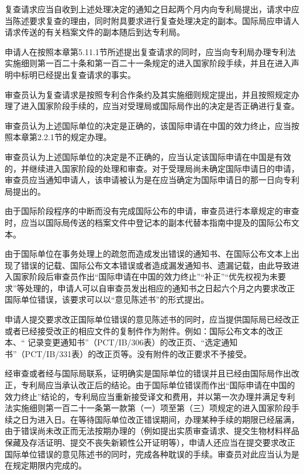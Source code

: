 复查请求应当自收到上述处理决定的通知之日起两个月内向专利局提出，请求中应当陈述要求复查的理由，同时附具要求进行复查处理决定的副本。国际局应申请人请求传送的有关档案文件的副本随后到达专利局。

申请人在按照本章第5.11.1节所述提出复查请求的同时，应当向专利局办理专利法实施细则第一百二十条和第一百二十一条规定的进入国家阶段手续，并且在进入声明中标明已经提出复查请求的事实。

审查员认为复查请求是按照专利合作条约及其实施细则规定提出，并且按照规定办理了进入国家阶段手续的，应当对受理局或国际局作出的决定是否正确进行复查。

审查员认为上述国际单位的决定是正确的，该国际申请在中国的效力终止，应当按照本章第2.2.1节的规定办理。

审查员认为上述国际单位的决定是不正确的，应当认定该国际申请在中国是有效的，并继续进入国家阶段的处理和审查。对于受理局尚未确定国际申请日的申请，审查员应当通知申请人，该申请被认为是在应当确定为国际申请日的那一日向专利局提出的。

由于国际阶段程序的中断而没有完成国际公布的申请，审查员进行本章规定的审查时，应当以国际局传送的档案文件中登记本的副本代替本指南中提及的国际公布文本。

由于国际单位在事务处理上的疏忽而造成发出错误的通知书、在国际公布文本上出现了错误的记载、国际公布文本错误或者造成漏发通知书、遗漏记载，由此导致进入国家阶段后审查员作出“国际申请在中国的效力终止”“补正”“优先权视为未要求”等处理的，申请人可以自审查员发出相应的通知书之日起六个月之内要求改正国际单位错误，该要求可以以“意见陈述书”的形式提出。

申请人提交要求改正国际单位错误的意见陈述书的同时，应当提供国际局已经改正或者已经接受改正的相应文件的复制件作为附件。例如：国际公布文本的改正本、“ 记录变更通知书”（PCT/IB/306表）的改正页、“选定通知书”（PCT/IB/331表）的改正页等。没有附件的改正要求不予接受。

经审查或者经与国际局联系，证明确实是国际单位的错误并且已经由国际局作出改正，专利局应当承认改正后的结论。由于国际单位错误而作出“国际申请在中国的效力终止”结论的，专利局应当重新接受译文和费用，并以第一次办理并满足专利法实施细则第一百二十一条第一款第（一）项至第（三）项规定的进入国家阶段手续之日为进入日。在等待国际单位改正错误期间，办理某种手续的期限已经届满，由于错误尚未改正而无法按期办理的（例如提出实质审查请求、提交生物材料样品保藏及存活证明、提交不丧失新颖性公开证明等），申请人还应当在提交要求改正国际单位错误的意见陈述书的同时，完成各种耽误的手续。审查员对此应当认为是在规定期限内完成的。

